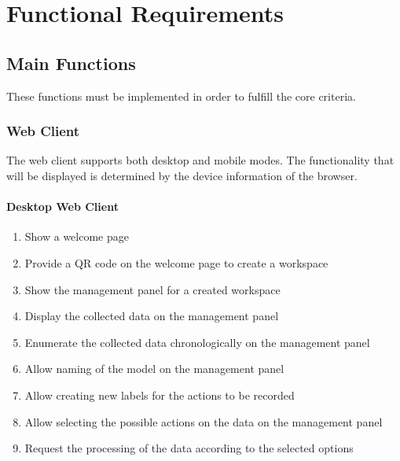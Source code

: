 \section{Functional Requirements}

\subsection{Main Functions}
These functions must be implemented in order to fulfill the core criteria.

\subsubsection{Web Client}
The web client supports both desktop and mobile modes. The functionality that will be displayed is determined by the device information of the browser.

\paragraph{Desktop Web Client}

\def\twodigits#1{%
  \ifnum#1<10 0\fi
  \number#1}

\begin{enumerate}[{label = \textbf{/F{\protect\twodigits{\arabic{enumi}}}0/}, leftmargin = *}]
    \item Show a welcome page
    \item Provide a QR code on the welcome page to create a \gls{workspace}
    \item Show the management panel for a created workspace
    \item Display the collected data on the management panel
    \item Enumerate the collected data chronologically on the management panel
    \item Allow naming of the model on the management panel
    \item Allow creating new labels for the actions to be recorded
    \item Allow selecting the possible actions on the data on the management panel %
    \item Request the processing of the data according to the selected options
\end{enumerate}

